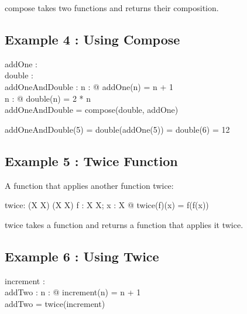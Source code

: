 \documentclass[a4paper,10pt,fleqn]{article}
\begin{document}
\noindent compose takes two functions and returns their composition.

\bigskip

\subsection*{Example 4 : Using Compose}

\begin{axdef}
addOne : \nat \fun \nat \\
double : \nat \fun \nat \\
addOneAndDouble : \nat \fun \nat
\where
\forall n : \nat @ addOne(n) = n + 1 \\
\forall n : \nat @ double(n) = 2 * n \\
addOneAndDouble = compose(double, addOne)
\end{axdef}

\noindent addOneAndDouble(5) = double(addOne(5)) = double(6) = 12

\bigskip

\subsection*{Example 5 : Twice Function}

\noindent A function that applies another function twice:

\bigskip

\begin{gendef}[X]
  twice: (X \fun X) \fun (X \fun X)
\where
  \forall f : X \fun X; x : X @ twice(f)(x) = f(f(x))
\end{gendef}

\noindent twice takes a function and returns a function that applies it twice.

\bigskip

\subsection*{Example 6 : Using Twice}

\begin{axdef}
increment : \nat \fun \nat \\
addTwo : \nat \fun \nat
\where
\forall n : \nat @ increment(n) = n + 1 \\
addTwo = twice(increment)
\end{axdef}
\end{document}
